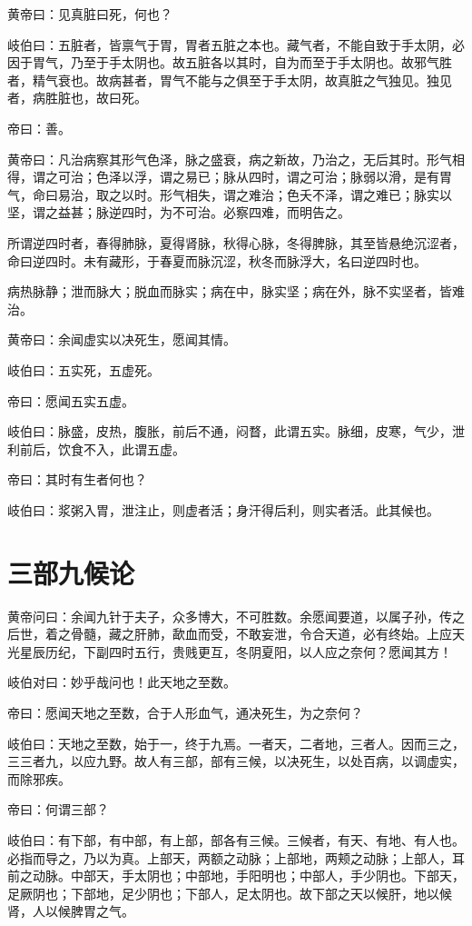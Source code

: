 \documentclass{article}%
\begin{document}
黄帝曰：见真脏曰死，何也？

岐伯曰：五脏者，皆禀气于胃，胃者五脏之本也。藏气者，不能自致于手太阴，必因于胃气，乃至于手太阴也。故五脏各以其时，自为而至于手太阴也。故邪气胜者，精气衰也。故病甚者，胃气不能与之俱至于手太阴，故真脏之气独见。独见者，病胜脏也，故曰死。

帝曰：善。

黄帝曰：凡治病察其形气色泽，脉之盛衰，病之新故，乃治之，无后其时。形气相得，谓之可治；色泽以浮，谓之易已；脉从四时，谓之可治；脉弱以滑，是有胃气，命曰易治，取之以时。形气相失，谓之难治；色夭不泽，谓之难已；脉实以坚，谓之益甚；脉逆四时，为不可治。必察四难，而明告之。

所谓逆四时者，春得肺脉，夏得肾脉，秋得心脉，冬得脾脉，其至皆悬绝沉涩者，命曰逆四时。未有藏形，于春夏而脉沉涩，秋冬而脉浮大，名曰逆四时也。

病热脉静；泄而脉大；脱血而脉实；病在中，脉实坚；病在外，脉不实坚者，皆难治。

黄帝曰：余闻虚实以决死生，愿闻其情。

岐伯曰：五实死，五虚死。

帝曰：愿闻五实五虚。

岐伯曰：脉盛，皮热，腹胀，前后不通，闷瞀，此谓五实。脉细，皮寒，气少，泄利前后，饮食不入，此谓五虚。

帝曰：其时有生者何也？

岐伯曰：浆粥入胃，泄注止，则虚者活；身汗得后利，则实者活。此其候也。
\section{三部九候论}
黄帝问曰：余闻九针于夫子，众多博大，不可胜数。余愿闻要道，以属子孙，传之后世，着之骨髓，藏之肝肺，歃血而受，不敢妄泄，令合天道，必有终始。上应天光星辰历纪，下副四时五行，贵贱更互，冬阴夏阳，以人应之奈何？愿闻其方！

岐伯对曰：妙乎哉问也！此天地之至数。

帝曰：愿闻天地之至数，合于人形血气，通决死生，为之奈何？

岐伯曰：天地之至数，始于一，终于九焉。一者天，二者地，三者人。因而三之，三三者九，以应九野。故人有三部，部有三候，以决死生，以处百病，以调虚实，而除邪疾。

帝曰：何谓三部？

岐伯曰：有下部，有中部，有上部，部各有三候。三候者，有天、有地、有人也。必指而导之，乃以为真。上部天，两额之动脉；上部地，两颊之动脉；上部人，耳前之动脉。中部天，手太阴也；中部地，手阳明也；中部人，手少阴也。下部天，足厥阴也；下部地，足少阴也；下部人，足太阴也。故下部之天以候肝，地以候肾，人以候脾胃之气。
\end{document}
